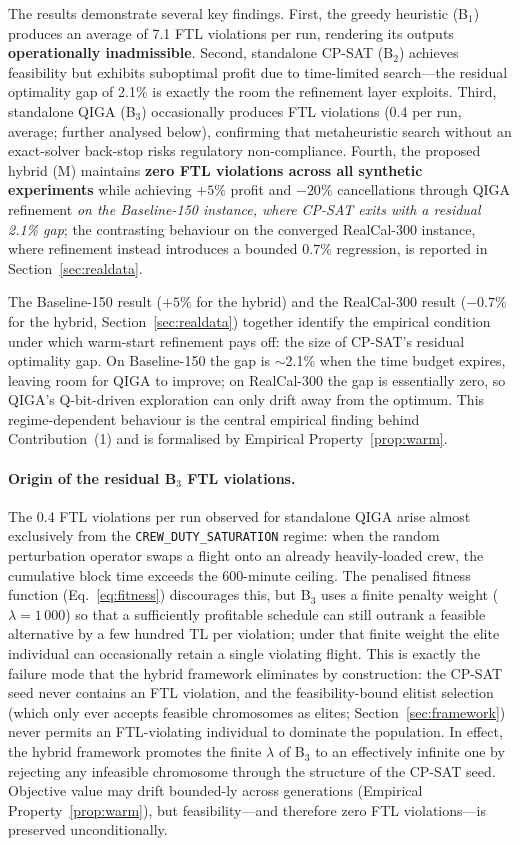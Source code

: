 \documentclass[12pt,number]{elsarticle}
\begin{document}
The results demonstrate several key findings. First, the greedy heuristic (B$_1$) produces an average of 7.1 FTL violations per run, rendering its outputs \textbf{operationally inadmissible}. Second, standalone CP-SAT (B$_2$) achieves feasibility but exhibits suboptimal profit due to time-limited search---the residual optimality gap of 2.1\% is exactly the room the refinement layer exploits. Third, standalone QIGA (B$_3$) occasionally produces FTL violations (0.4 per run, average; further analysed below), confirming that metaheuristic search without an exact-solver back-stop risks regulatory non-compliance. Fourth, the proposed hybrid (M) maintains \textbf{zero FTL violations across all synthetic experiments} while achieving $+5\%$ profit and $-20\%$ cancellations through QIGA refinement \emph{on the Baseline-150 instance, where CP-SAT exits with a residual 2.1\% gap}; the contrasting behaviour on the converged RealCal-300 instance, where refinement instead introduces a bounded $0.7\%$ regression, is reported in Section~\ref{sec:realdata}.

The Baseline-150 result ($+5\%$ for the hybrid) and the RealCal-300 result ($-0.7\%$ for the hybrid, Section~\ref{sec:realdata}) together identify the empirical condition under which warm-start refinement pays off: the size of CP-SAT's residual optimality gap. On Baseline-150 the gap is $\sim$2.1\% when the time budget expires, leaving room for QIGA to improve; on RealCal-300 the gap is essentially zero, so QIGA's Q-bit-driven exploration can only drift away from the optimum. This regime-dependent behaviour is the central empirical finding behind Contribution~(1) and is formalised by Empirical Property~\ref{prop:warm}.

\paragraph*{Origin of the residual B$_3$ FTL violations.} The 0.4 FTL violations per run observed for standalone QIGA arise almost exclusively from the \texttt{CREW\_DUTY\_SATURATION} regime: when the random perturbation operator swaps a flight onto an already heavily-loaded crew, the cumulative block time exceeds the 600-minute ceiling. The penalised fitness function (Eq.~\ref{eq:fitness}) discourages this, but B$_3$ uses a finite penalty weight ($\lambda = 1\,000$) so that a sufficiently profitable schedule can still outrank a feasible alternative by a few hundred TL per violation; under that finite weight the elite individual can occasionally retain a single violating flight. This is exactly the failure mode that the hybrid framework eliminates by construction: the CP-SAT seed never contains an FTL violation, and the feasibility-bound elitist selection (which only ever accepts feasible chromosomes as elites; Section~\ref{sec:framework}) never permits an FTL-violating individual to dominate the population. In effect, the hybrid framework promotes the finite $\lambda$ of B$_3$ to an effectively infinite one by rejecting any infeasible chromosome through the structure of the CP-SAT seed. Objective value may drift bounded-ly across generations (Empirical Property~\ref{prop:warm}), but feasibility---and therefore zero FTL violations---is preserved unconditionally.
\end{document}
